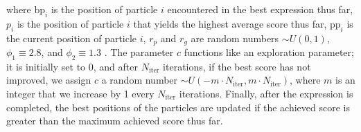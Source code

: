 \documentclass[runningheads]{llncs}
\begin{document}
where $\mathrm{bp}_i$ is the position of particle $i$ encountered in the best expression thus far, $p_i$ is the position of particle $i$ that yields the highest average score thus far, $\mathrm{pp}_i$ is the current position of particle $i$, $r_p$ and $r_g$ are random numbers $\sim U(0,1)$, $\phi_1 \equiv 2.8$, and $\phi_2 \equiv 1.3$  \cite{offShellPSO}. The parameter $c$ functions like an exploration parameter; it is initially set to 0, and after $N_{\mathrm{iter}}$ iterations, if the best score has not improved, we assign $c$ a random number $\sim U(-m\cdot N_{\mathrm{iter}}, m\cdot N_{\mathrm{iter}})$, where $m$ is an integer that we increase by 1 every $N_{\mathrm{iter}}$ iterations. Finally, after the expression is completed, the best positions of the particles are updated if the achieved score is greater than the maximum achieved score thus far.
\end{document}
